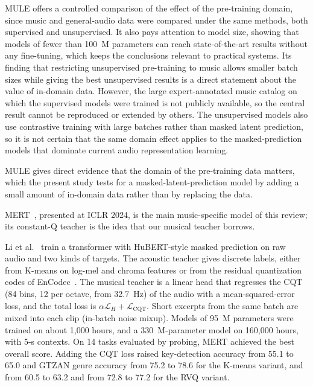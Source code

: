 \documentclass{FastFyp}
\begin{document}
\lrcritical
MULE offers a controlled comparison of the effect of the pre-training domain, since music and general-audio data were compared under the same methods, both supervised and unsupervised. It also pays attention to model size, showing that models of fewer than 100~M parameters can reach state-of-the-art results without any fine-tuning, which keeps the conclusions relevant to practical systems. Its finding that restricting unsupervised pre-training to music allows smaller batch sizes while giving the best unsupervised results is a direct statement about the value of in-domain data. However, the large expert-annotated music catalog on which the supervised models were trained is not publicly available, so the central result cannot be reproduced or extended by others. The unsupervised models also use contrastive training with large batches rather than masked latent prediction, so it is not certain that the same domain effect applies to the masked-prediction models that dominate current audio representation learning.

\lrrelation
MULE gives direct evidence that the domain of the pre-training data matters, which the present study tests for a masked-latent-prediction model by adding a small amount of in-domain data rather than by replacing the data.

MERT~\cite{ref:Li:2024mert}, presented at ICLR 2024, is the main music-specific model of this review; its constant-Q teacher is the idea that our musical teacher borrows.

\lrsummary
Li et al.~\cite{ref:Li:2024mert} train a transformer with HuBERT-style masked prediction on raw audio and two kinds of targets. The acoustic teacher gives discrete labels, either from K-means on log-mel and chroma features or from the residual quantization codes of EnCodec~\cite{ref:Defossez:2023encodec}. The musical teacher is a linear head that regresses the CQT (84 bins, 12 per octave, from 32.7~Hz) of the audio with a mean-squared-error loss, and the total loss is $\alpha\mathcal{L}_{H}+\mathcal{L}_{\mathrm{CQT}}$. Short excerpts from the same batch are mixed into each clip (in-batch noise mixup). Models of 95~M parameters were trained on about 1,000 hours, and a 330~M-parameter model on 160,000 hours, with 5-s contexts. On 14 tasks evaluated by probing, MERT achieved the best overall score. Adding the CQT loss raised key-detection accuracy from 55.1 to 65.0 and GTZAN genre accuracy from 75.2 to 78.6 for the K-means variant, and from 60.5 to 63.2 and from 72.8 to 77.2 for the RVQ variant.
\end{document}
